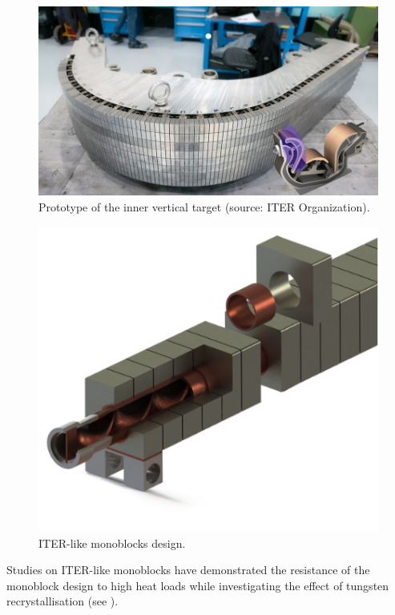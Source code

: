 \begin{figure} [h]
    \centering
    \includegraphics[width=0.8\linewidth]{Figures/Chapter1/inner_target_iter.jpg}
    \caption{Prototype of the inner vertical target (source: ITER Organization).}
    \label{fig: inner target photo}
\end{figure}

\begin{figure} [h]
    \centering
    \includegraphics[width=0.5\linewidth]{Figures/Chapter1/monoblocks_with_pipe.png}
    \caption{ITER-like monoblocks design.}
    \label{fig: monoblocks with pipe}
\end{figure}

Studies on ITER-like monoblocks have demonstrated the resistance of the monoblock design to high heat loads while investigating the effect of tungsten recrystallisation  (see ).

